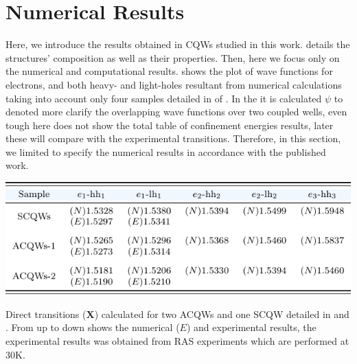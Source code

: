 \section{Numerical Results}
\label{sec:chapter-2-numerical-results}
\vspace{-10mm} 
Here, we introduce the results obtained in \gls{CQWs} studied in this work.  
details the structures' composition as well as their properties. Then, here we focus only on the numerical and computational results.  shows the plot of wave functions for electrons, and both heavy- and light-holes resultant from numerical calculations taking into account only four samples detailed in  of .
In the  it is calculated $\psi$ to denoted more clarify the overlapping wave functions over two coupled wells, even tough here does not show the total table of confinement energies results, later these will  compare with the experimental transitions.  Therefore, in this section, we limited to specify the numerical results  in accordance with the published work\cite{ruiz2021optical}. 
\begin{table}[ht!]
	\centering
	\includegraphics[width=\textwidth]{../tables/chapter-2/numerical-results/build-ruco/numerical-results.pdf}
	\caption{Direct transitions ($\mathbf{X}$) calculated for two ACQWs and one SCQW detailed in  and . From up to down shows the numerical ($E$) and experimental results, the experimental results was obtained from RAS experiments which are performed at 30K. }
	\label{tab:sec-chapter-2-numerical-results} 
\end{table}
